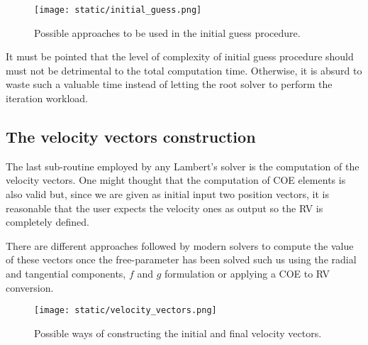\vspace{0.5cm}
\begin{figure}[h]
  \centering
  \texttt{[image: static/initial\_guess.png]}
  \caption{Possible approaches to be used in the initial guess procedure.}
  \label{fig:initial_guess}
\end{figure}

It must be pointed that the level of complexity of initial guess procedure
should must not be detrimental to the total computation time. Otherwise, it is
absurd to waste such a valuable time instead of letting the root solver to
perform the iteration workload.

\subsection{The velocity vectors construction}

The last sub-routine employed by any Lambert's solver is the computation of the
velocity vectors. One might thought that the computation of COE elements is also
valid but, since we are given as initial input two position vectors, it is
reasonable that the user expects the velocity ones as output so the RV is
completely defined.

There are different approaches followed by modern solvers to compute the value
of these vectors once the free-parameter has been solved such us using the
radial and tangential components, $f$ and $g$ formulation or applying a COE to
RV conversion.

\vspace{0.5cm}
\begin{figure}[h]
  \centering
  \texttt{[image: static/velocity\_vectors.png]}
  \caption{Possible ways of constructing the initial and final velocity vectors.}
  \label{fig:velocity_vectors}
\end{figure}

